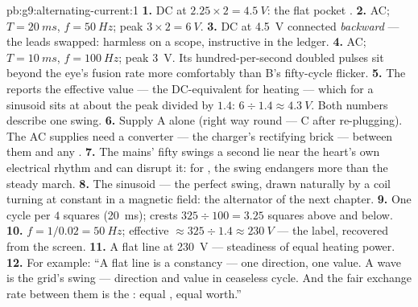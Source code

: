 \begin{solution}{pb:g9:alternating-current:1}
\textbf{1.} DC at $2.25 \times 2 = \qty{4.5}{V}$: the flat
pocket .
\textbf{2.} AC; $T = \qty{20}{ms}$, $f = \qty{50}{Hz}$; peak
$3 \times 2 = \qty{6}{V}$.
\textbf{3.} DC at \qty{4.5}{V} connected \emph{backward} ---
the leads swapped: harmless on a scope, instructive in the
ledger.
\textbf{4.} AC; $T = \qty{10}{ms}$, $f = \qty{100}{Hz}$;
peak \qty{3}{V}. Its hundred-per-second doubled pulses sit
beyond the eye's fusion rate more comfortably than B's
fifty-cycle flicker.
\textbf{5.} The  reports the effective value ---
the DC-equivalent for heating --- which for a sinusoid sits
at about the peak divided by $1.4$: $6 \div 1.4 \approx
\qty{4.3}{V}$. Both numbers describe one swing.
\textbf{6.} Supply A alone (right way round --- C after
re-plugging). The AC supplies need a converter --- the
charger's rectifying brick --- between them and any
.
\textbf{7.} The mains' fifty swings a second lie near the
heart's own electrical rhythm and can disrupt it: 
for , the swing endangers more than the steady march.
\textbf{8.} The sinusoid --- the perfect swing, drawn
naturally by a coil turning at constant  in a magnetic
field: the alternator of the next chapter.
\textbf{9.} One cycle per $4$ squares (\qty{20}{ms}); crests
$325 \div 100 = 3.25$ squares above and below.
\textbf{10.} $f = 1/0.02 = \qty{50}{Hz}$; effective $\approx
325 \div 1.4 \approx \qty{230}{V}$ --- the label,
recovered from the screen.
\textbf{11.} A flat line at \qty{230}{V} --- steadiness of
equal heating power.
\textbf{12.} For example: ``A flat line is a 
constancy --- one direction, one value. A wave is the
grid's swing --- direction and value in ceaseless cycle.
And the fair exchange rate between them is the : equal , equal worth.''
\end{solution}
